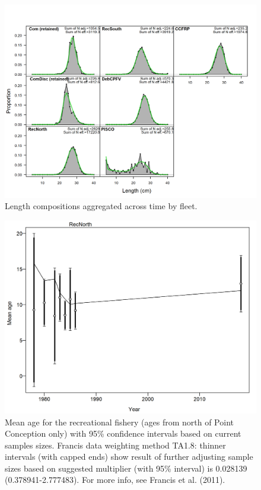 \documentclass[12pt,]{article}
\begin{document}
\FloatBarrier 

\begin{figure}
\centering
\includegraphics{r4ss/plots_mod1/comp_lenfit__aggregated_across_time.png}
\caption{Length compositions aggregated across time by fleet.
\label{fig:comp_lenfit__aggregated_across_time}}
\end{figure}

\FloatBarrier

\begin{figure}
\centering
\includegraphics{r4ss/plots_mod1/comp_condAALfit_data_weighting_TA1.8_condAgeRecNorth.png}
\caption{Mean age for the recreational fishery (ages from north of Point
Conception only) with 95\% confidence intervals based on current samples
sizes. Francis data weighting method TA1.8: thinner intervals (with
capped ends) show result of further adjusting sample sizes based on
suggested multiplier (with 95\% interval) is 0.028139
(0.378941-2.777483). For more info, see Francis et al. (2011).
\label{fig:comp_condAALfit_data_weighting_TA1.8_condAgeRecNorth}}
\end{figure}
\end{document}
